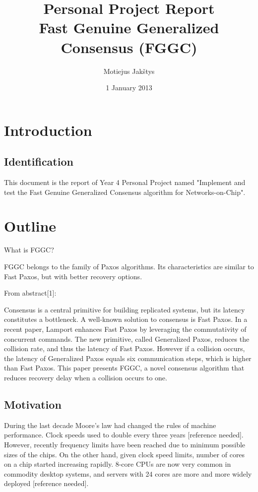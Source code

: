 \documentclass[english,11pt]{article}
\numberwithin{equation}{section}
\begin{document}
\title{Personal Project Report\\
    Fast Genuine Generalized Consensus (FGGC)}
\author{Motiejus Jakštys}
\date{1 January 2013}

\maketitle
\pagebreak
\tableofcontents
\pagebreak

\section{Introduction}
\subsection{Identification}

This document is the report of Year 4 Personal Project named "Implement and
test the Fast Genuine Generalized Consensus algorithm for Networks-on-Chip".

\section{Outline}

What is FGGC?

FGGC belongs to the family of Paxos algorithms. Its characteristics are similar
to Fast Paxos, but with better recovery options.

From abstract[1]:

Consensus is a central primitive for building replicated systems, but its
latency constitutes a bottleneck. A well-known solution to consensus is Fast
Paxos. In a recent paper, Lamport enhances Fast Paxos by leveraging the
commutativity of concurrent commands. The new primitive, called Generalized
Paxos, reduces the collision rate, and thus the latency of Fast Paxos. However
if a collision occurs, the latency of Generalized Paxos equals six
communication steps, which is higher than Fast Paxos. This paper presents FGGC,
a novel consensus algorithm that reduces recovery delay when a collision occurs
to one.

\subsection{Motivation}

During the last decade Moore's law had changed the rules of machine
performance. Clock speeds used to double every three years [reference needed].
However, recently frequency limits have been reached due to minimum possible
sizes of the chips. On the other hand, given clock speed limits, number of
cores on a chip started increasing rapidly. 8-core CPUs are now very common in
commodity desktop systems, and servers with 24 cores are more and more widely
deployed [reference needed].
\end{document}
